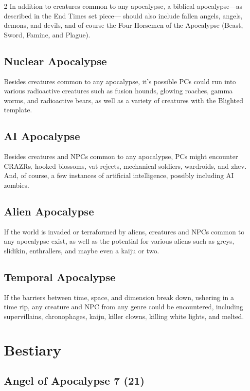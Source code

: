 \begin{multicols}{2}
In addition to creatures common to any apocalypse, a biblical apocalypse—as described in the End Times set piece— should also include fallen angels, angels, demons, and devils, and of course the Four Horsemen of the Apocalypse (Beast, Sword, Famine, and Plague).

\subsection{Nuclear Apocalypse}

Besides creatures common to any apocalypse, it’s possible PCs could run into various radioactive creatures such as fusion hounds, glowing roaches, gamma worms, and radioactive bears, as well as a variety of creatures with the Blighted template.

\subsection{AI Apocalypse}

Besides creatures and NPCs common to any apocalypse, PCs might encounter CRAZRs, hooked blossoms, vat rejects, mechanical soldiers, wardroids, and zhev. And, of course, a few instances of artificial intelligence, possibly including AI zombies.

\subsection{Alien Apocalypse}

If the world is invaded or terraformed by aliens, creatures and NPCs common to any apocalypse exist, as well as the potential for various aliens such as greys, slidikin, enthrallers, and maybe even a kaiju or two.

\subsection{Temporal Apocalypse}

If the barriers between time, space, and dimension break down, ushering in a time rip, any creature and NPC from any genre could be encountered, including supervillains, chronophages, kaiju, killer clowns, killing white lights, and melted.

\section{Bestiary}

\subsection{Angel of Apocalypse 7 (21)}


\end{multicols}

